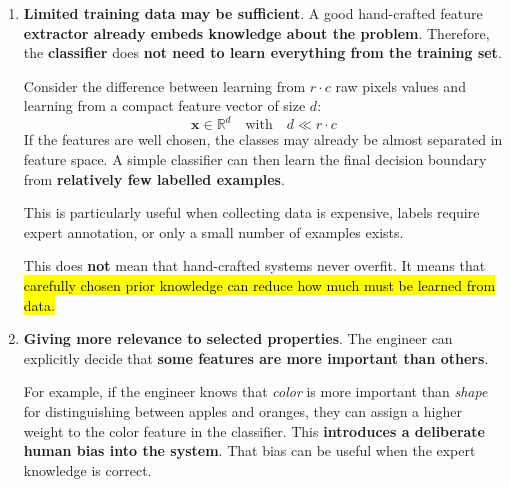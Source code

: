 \begin{enumerate}
    
    \item \textcolor{Green3}{\textbf{Limited training data may be sufficient}}. A good hand-crafted feature \textbf{extractor already embeds knowledge about the problem}. Therefore, the \textbf{classifier} does \textbf{not need to learn everything from the training set}.
    
    \highspace
    Consider the difference between learning from $r \cdot c$ raw pixels values and learning from a compact feature vector of size $d$:
    \begin{equation*}
        \mathbf{x} \in \mathbb{R}^{d} \quad \text{with} \quad d \ll r \cdot c
    \end{equation*}
    If the features are well chosen, the classes may already be almost separated in feature space. A simple classifier can then learn the final decision boundary from \textbf{relatively few labelled examples}.

    \highspace
    This is particularly useful when collecting data is expensive, labels require expert annotation, or only a small number of examples exists.
    
    \highspace
    \textcolor{Red2}{} This does \textbf{not} mean that hand-crafted systems never overfit. It means that \hl{carefully chosen prior knowledge can reduce how much must be learned from data.}


    \item \textcolor{Green3}{\textbf{Giving more relevance to selected properties}}. The engineer can explicitly decide that \textbf{some features are more important than others}.
    
    \highspace
    For example, if the engineer knows that \emph{color} is more important than \emph{shape} for distinguishing between apples and oranges, they can assign a higher weight to the color feature in the classifier. This \textbf{introduces a deliberate human bias into the system}. That bias can be useful when the expert knowledge is correct.
\end{enumerate}

